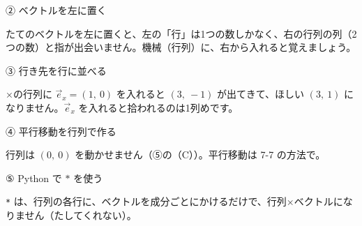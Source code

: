 \noindent\begin{minipage}[t]{0.485\linewidth}\vspace{0pt}
\begin{tsumazuki}{② ベクトルを左に置く}
\raggedright{}
たてのベクトルを左に置くと、左の「行」は1つの数しかなく、右の行列の列（2つの数）と指が出会いません。機械（行列）に、右から入れると覚えましょう。
\end{tsumazuki}
\end{minipage}\hfill
\begin{minipage}[t]{0.485\linewidth}\vspace{0pt}
\begin{tsumazuki}{③ 行き先を行に並べる}
\raggedright{}
×の行列に $\vec e_x=(1,\ 0)$ を入れると $(3,\ -1)$ が出てきて、ほしい $(3,\ 1)$ になりません。$\vec e_x$ を入れると拾われるのは1列めです。
\end{tsumazuki}
\end{minipage}

\noindent\begin{minipage}[t]{0.485\linewidth}\vspace{0pt}
\begin{tsumazuki}{④ 平行移動を行列で作る}
\raggedright
{}
行列は $(0,\ 0)$ を動かせません（⑤の（C））。平行移動は 7-7 の方法で。
\end{tsumazuki}
\end{minipage}\hfill
\begin{minipage}[t]{0.485\linewidth}\vspace{0pt}
\begin{tsumazuki}{⑤ Python で $*$ を使う}
\raggedright
{}
\texttt{*} は、行列の各行に、ベクトルを成分ごとにかけるだけで、行列×ベクトルになりません（たしてくれない）。
\end{tsumazuki}
\end{minipage}

